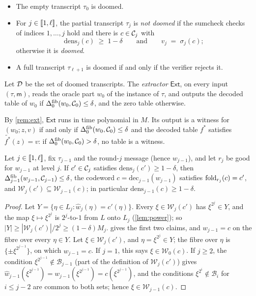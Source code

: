\begin{definition}\label{def:state}
\begin{itemize}
  \item The empty transcript $\tau_0$ is doomed.
  \item For $j \in \llbracket 1, \ell \rrbracket$, the partial transcript $\tau_j$ is \emph{not doomed} if the sumcheck checks of indices $1,\dots,j$ hold and there is $c \in \mathcal{C}_j$ with
  \[
    \mathrm{dens}_j(c) \;\ge\; 1 - \delta
    \qquad\text{and}\qquad
    v_j \;=\; \sigma_j(c);
  \]
  otherwise it is \emph{doomed}.
  \item A full transcript $\tau_{\ell+1}$ is doomed if and only if the verifier rejects it.
\end{itemize}
Let $\mathcal{D}$ be the set of doomed transcripts.
The \emph{extractor} $\mathsf{Ext}$, on every input $(\tau, \mathsf{m})$, reads the oracle part $w_0$ of the instance of $\tau$, and outputs the decoded table of $w_0$ if $\Delta^{\mathrm{fib}}_0(w_0,\mathcal{C}_0) \le \delta$, and the zero table otherwise.
\end{definition}

By \cref{rem:ext}, $\mathsf{Ext}$ runs in time polynomial in $M$.
Its output is a witness for $(w_0;z,v)$ if and only if $\Delta^{\mathrm{fib}}_0(w_0,\mathcal{C}_0) \le \delta$ and the decoded table $f^*$ satisfies $\tilde{f^*}(z) = v$: if $\Delta^{\mathrm{fib}}_0(w_0,\mathcal{C}_0) > \delta$, no table is a witness.

\begin{lemma}\label{lem:rbr-step}
Let $j \in \llbracket 1, \ell \rrbracket$, fix $\tau_{j-1}$ and the round-$j$ message (hence $w_{j-1}$), and let $r_j$ be good for $w_{j-1}$ at level $j$.
If $c' \in \mathcal{C}_j$ satisfies $\mathrm{dens}_{j}(c') \ge 1-\delta$, then $\Delta^{\mathrm{fib}}_{j-1}(w_{j-1}, \mathcal{C}_{j-1}) \le \delta$, the codeword $c = \mathrm{dec}_{j-1}(w_{j-1})$ satisfies $\mathrm{fold}_{r_j}(c) = c'$, and $\mathcal{W}_{j}(c') \subseteq \mathcal{W}_{j-1}(c)$; in particular $\mathrm{dens}_{j-1}(c) \ge 1-\delta$.
\end{lemma}

\begin{proof}
Let $Y = \{\eta \in L_{j} : \hat w_j(\eta) = c'(\eta)\}$. Every $\xi \in \mathcal{W}_{j}(c')$ has $\xi^{2^j} \in Y$, and the map $\xi \mapsto \xi^{2^j}$ is $2^j$-to-$1$ from $L$ onto $L_j$ (\cref{lem:power}); so $|Y| \ge |\mathcal{W}_j(c')|/2^j \ge (1-\delta)M_j$.
 gives the first two claims, and $w_{j-1} = c$ on the fibre over every $\eta \in Y$.
Let $\xi \in \mathcal{W}_{j}(c')$, and $\eta = \xi^{2^j} \in Y$; the fibre over $\eta$ is $\{\pm \xi^{2^{j-1}}\}$, on which $w_{j-1} = c$.
If $j = 1$, this says $\xi \in \mathcal{W}_0(c)$.
If $j \ge 2$, the condition $\xi^{2^{j-1}} \notin \mathcal{B}_{j-1}$ (part of the definition of $\mathcal{W}_{j}(c')$) gives $\hat w_{j-1}(\xi^{2^{j-1}}) = w_{j-1}(\xi^{2^{j-1}}) = c(\xi^{2^{j-1}})$, and the conditions $\xi^{2^i} \notin \mathcal{B}_i$ for $i \le j-2$ are common to both sets; hence $\xi \in \mathcal{W}_{j-1}(c)$.
\end{proof}

